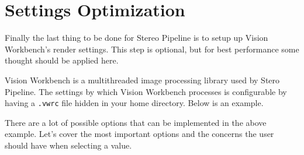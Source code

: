 \newpage
\section{\label{sec:Settings}Settings Optimization}

Finally the last thing to be done for Stereo Pipeline is to setup up
Vision Workbench's render settings. This step is optional, but for
best performance some thought should be applied here.

Vision Workbench is a multithreaded image processing library used by
Stero Pipeline. The settings by which Vision Workbench processes is
configurable by having a \texttt{.vwrc} file hidden in your home
directory. Below is an example.

\begin{minipage}{0.94\linewidth}
\small{}
\end{minipage}

There are a lot of possible options that can be implemented in the
above example. Let's cover the most important options and the concerns
the user should have when selecting a value.

